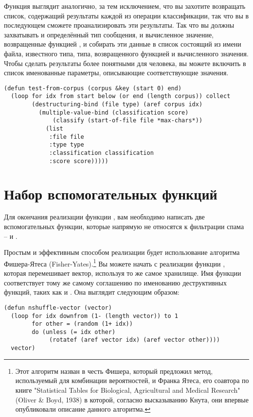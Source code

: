 Функция  выглядит аналогично, за тем исключением, что вы захотите
возвращать список, содержащий результаты каждой из операции классификации, так что вы в
последующем сможете проанализировать эти результаты.  Так что вы должны захватывать и
определённый тип сообщения, и вычисленное значение, возвращенные функцией ,
и собирать эти данные в список состоящий из имени файла, известного типа, типа,
возвращенного функцией  и вычисленного значения.  Чтобы сделать результаты
более понятными для человека, вы можете включить в список именованные параметры,
описывающие соответствующие значения.

\begin{lstlisting}
(defun test-from-corpus (corpus &key (start 0) end)
  (loop for idx from start below (or end (length corpus)) collect
        (destructuring-bind (file type) (aref corpus idx)
          (multiple-value-bind (classification score)
              (classify (start-of-file file *max-chars*))
            (list 
             :file file
             :type type
             :classification classification
             :score score)))))
\end{lstlisting}


\section{Набор вспомогательных функций}

Для окончания реализации функции , вам необходимо написать две
вспомогательных функции, которые напрямую не относятся к фильтрации спама --
 и .

Простым и эффективным способом реализации  будет использование
алгоритма Фишера-Ятеса (Fisher-Yates).\footnote{Этот алгоритм назван в честь Фишера,
  который предложил метод, используемый для комбинации вероятностей, и Франка Ятеса, его
  соавтора по книге "Statistical Tables for Biological, Agricultural and Medical Research"
  (Oliver \& Boyd, 1938) в которой, согласно высказыванию Кнута, они впервые опубликовали
  описание данного алгоритма.}  Вы можете начать с реализации функции
, которая перемешивает вектор, используя то же самое хранилище.  Имя
функции соответствует тому же самому соглашению по именованию деструктивных функций, таких
как  и .  Она выглядит следующим образом:

\begin{lstlisting}
(defun nshuffle-vector (vector)
  (loop for idx downfrom (1- (length vector)) to 1
        for other = (random (1+ idx))
        do (unless (= idx other)
             (rotatef (aref vector idx) (aref vector other))))
  vector)
\end{lstlisting}

